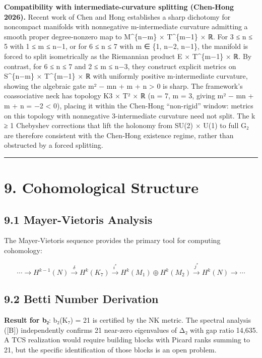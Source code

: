\documentclass[11pt,a4paper]{article}
\begin{document}
\textbf{Compatibility with intermediate-curvature splitting (Chen-Hong 2026).} Recent work of Chen and Hong \cite{48} establishes a sharp dichotomy for noncompact manifolds with nonnegative m-intermediate curvature admitting a smooth proper degree-nonzero map to M\^{}\{n−m\} × T\^{}\{m−1\} × ℝ. For 3 ≤ n ≤ 5 with 1 ≤ m ≤ n−1, or for 6 ≤ n ≤ 7 with m ∈ \{1, n−2, n−1\}, the manifold is forced to split isometrically as the Riemannian product E × T\^{}\{m−1\} × ℝ. By contrast, for 6 ≤ n ≤ 7 and 2 ≤ m ≤ n−3, they construct explicit metrics on S\^{}\{n−m\} × T\^{}\{m−1\} × ℝ with uniformly positive m-intermediate curvature, showing the algebraic gate m² − mn + m + n \textgreater{} 0 is sharp. The framework's coassociative neck has topology K3 × T² × ℝ (n = 7, m = 3, giving m² − mn + m + n = −2 \textless{} 0), placing it within the Chen-Hong ``non-rigid'' window: metrics on this topology with nonnegative 3-intermediate curvature need not split. The k ≥ 1 Chebyshev corrections that lift the holonomy from SU(2) × U(1) to full G₂ are therefore consistent with the Chen-Hong existence regime, rather than obstructed by a forced splitting.

\begin{center}\rule{\linewidth}{0.5pt}\end{center}

\section{9. Cohomological Structure}\label{cohomological-structure}

\subsection{9.1 Mayer-Vietoris Analysis}\label{mayer-vietoris-analysis}

The Mayer-Vietoris sequence provides the primary tool for computing cohomology:

\[\cdots \to H^{k-1}(N) \xrightarrow{\delta} H^k(K_7) \xrightarrow{i^*} H^k(M_1) \oplus H^k(M_2) \xrightarrow{j^*} H^k(N) \to \cdots\]

\subsection{9.2 Betti Number Derivation}\label{betti-number-derivation}

\textbf{Result for b₂}: b₂(K₇) = 21 is certified by the NK metric. The spectral analysis ({[}B{]}) independently confirms 21 near-zero eigenvalues of Δ₂ with gap ratio 14,635. A TCS realization would require building blocks with Picard ranks summing to 21, but the specific identification of those blocks is an open problem.
\end{document}
